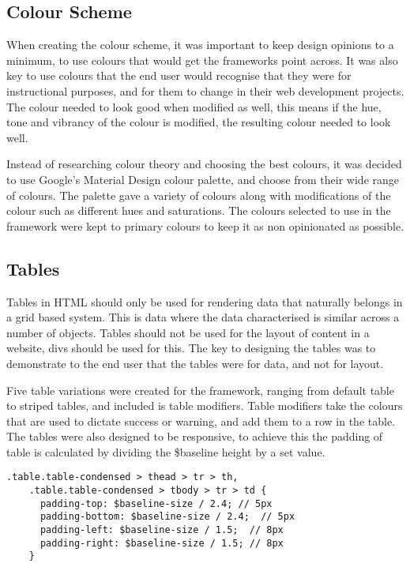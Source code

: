 \subsection*{Colour Scheme}
When creating the colour scheme, it was important to keep design opinions to a minimum, to use colours that would get the frameworks point across. It was also key to use colours that the end user would recognise that they were for instructional purposes, and for them to change in their web development projects. The colour needed to look good when modified as well, this means if the hue, tone and vibrancy of the colour is modified, the resulting colour needed to look well. 

Instead of researching colour theory and choosing the best colours, it was decided to use Google's Material Design \citet{Google17} colour palette, and choose from their wide range of colours. The palette  gave a variety of colours along with modifications of the colour such as different hues and saturations. The colours selected to use in the framework were kept to primary colours to keep it as non opinionated as possible.

\subsection*{Tables}
Tables in HTML should only be used for rendering data that naturally belongs in a grid based system. This is data where the data characterised is similar across a number of objects. Tables should not be used for the layout of content in a website, divs should be used for this. The key to designing the tables was to demonstrate to the end user that the tables were for data, and not for layout.

Five table variations were created for the framework, ranging from default table to striped tables, and included is table modifiers. Table modifiers take the colours that are used to dictate success or warning, and add them to a row in the table. The tables were also designed to be responsive, to achieve this the padding of table is calculated by dividing the \$baseline height by a set value. 

\begin{lstlisting}[language=CSS3]
    .table.table-condensed > thead > tr > th,
    .table.table-condensed > tbody > tr > td {
      padding-top: $baseline-size / 2.4; // 5px
      padding-bottom: $baseline-size / 2.4;  // 5px
      padding-left: $baseline-size / 1.5;  // 8px
      padding-right: $baseline-size / 1.5; // 8px
    }
\end{lstlisting}


